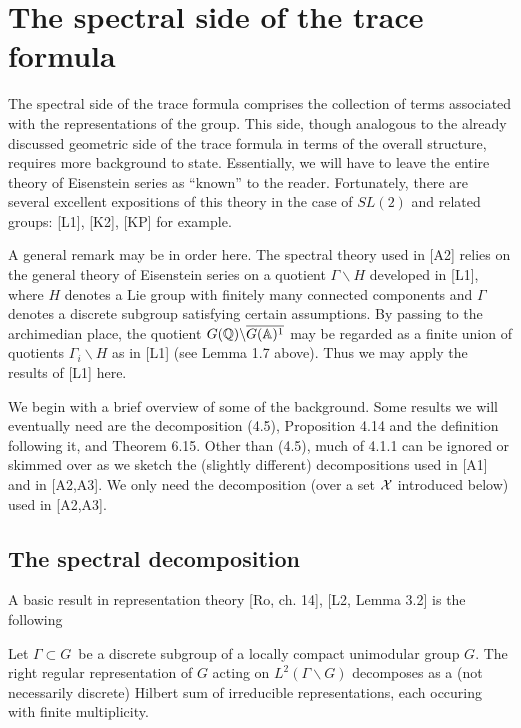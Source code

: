 \section{The spectral side of the trace formula}

The spectral side of the trace formula comprises the collection of terms
associated with the representations of the group. This side, though
analogous to the already discussed geometric side of the trace formula in
terms of the overall structure, requires more background to state.
Essentially, we will have to leave the entire theory of Eisenstein series as
``known'' to the reader. Fortunately, there are several excellent
expositions of this theory in the case of $SL(2)$ and related groups:
[L1], [K2], [KP] for example.

A general remark may be in order here. The spectral theory used in [A2]
relies on the general theory of Eisenstein series on a quotient $\Gamma
\backslash H$ developed in [L1], where $H$ denotes a Lie group with finitely
many connected components and $\Gamma $ denotes a discrete subgroup
satisfying certain assumptions. By passing to the archimedian place, the
quotient $G({\Bbb{Q}})\backslash \overline{G({\Bbb{A}})^1}$ may be regarded as a
finite union of quotients $\Gamma _i\backslash H$ as in [L1]
(see Lemma 1.7 above). Thus we may apply the results of [L1] here.

We begin with a brief overview of some of the background. Some results we
will eventually need are the decomposition (4.5), Proposition 4.14
and the definition following it, and Theorem 6.15. Other than (4.5),
much of 4.1.1 can be ignored or skimmed over as we sketch the
(slightly different) decompositions used in [A1] and in [A2,A3].
We only need the decomposition (over a set ${\cal{X}}$ introduced below)
used in [A2,A3].

\subsection{The spectral decomposition}

A basic result in representation theory [Ro, ch. 14], [L2, Lemma 3.2] is the
following

\begin{lemma}
Let $\Gamma \subset G$\ be a discrete subgroup of a locally compact
unimodular group $G$. The right regular representation of $G$
acting on $L^2(\Gamma \backslash G)$
decomposes as a (not necessarily discrete)
Hilbert sum of irreducible representations, each occuring with finite
multiplicity.
\end{lemma}

